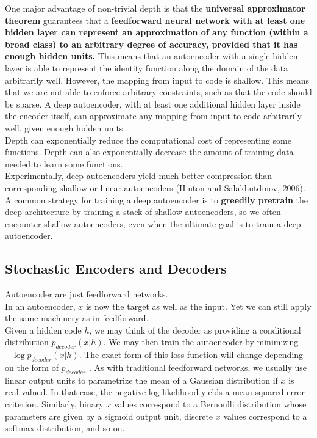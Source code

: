 \documentclass[11pt]{article}
\begin{document}
One major advantage of non-trivial depth is that the \textbf{universal approximator theorem} guarantees that a \textbf{feedforward neural network with at least one hidden layer can represent an approximation of any function (within a broad class) to an arbitrary degree of accuracy, provided that it has enough hidden units.} This means that an autoencoder with a single hidden layer is able to represent the identity function along the domain of the data arbitrarily well. However, the mapping from input to code is shallow. This means that we are not able to enforce arbitrary constraints, such as that the code should be sparse. A deep autoencoder, with at least one additional hidden layer inside the encoder itself, can approximate any mapping from input to code arbitrarily well, given enough hidden units.\\

Depth can exponentially reduce the computational cost of representing some functions. Depth can also exponentially decrease the amount of training data needed to learn some functions.\\

Experimentally, deep autoencoders yield much better compression than corresponding shallow or linear autoencoders (Hinton and Salakhutdinov, 2006).\\

A common strategy for training a deep autoencoder is to \textbf{greedily pretrain} the deep architecture by training a stack of shallow autoencoders, so we often encounter shallow autoencoders, even when the ultimate goal is to train a deep autoencoder.\\



\subsection{Stochastic Encoders and Decoders}
\label{sec:org7aa9d84}
Autoencoder are just feedforward networks.\\


In an autoencoder, \(x\) is now the target as well as the input. Yet we can still apply the same machinery as in feedforward.\\

Given a hidden code \(h\), we may think of the decoder as providing a conditional distribution \(p_{decoder}(x | h)\). We may then train the autoencoder by minimizing \(−\log p_{decoder}(x | h)\). The exact form of this loss function will change depending on the form of \(p_{decoder}\) . As with traditional feedforward networks, we usually use linear output units to parametrize the mean of a Gaussian distribution if \(x\) is real-valued. In that case, the negative log-likelihood yields a mean squared error criterion. Similarly, binary \(x\) values correspond to a Bernoulli distribution whose parameters are given by a sigmoid output unit, discrete \(x\) values correspond to a softmax distribution, and so on.\\
\end{document}
